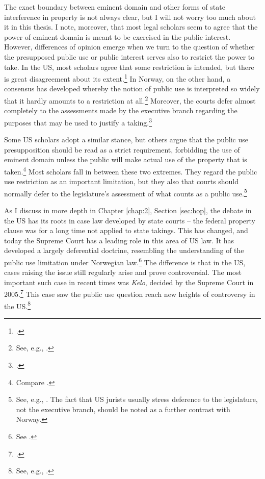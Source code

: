 The exact boundary between eminent domain and other forms of state interference in property is not always clear, but I will not worry too much about it in this thesis. I note, moreover, that most legal scholars seem to agree that the power of eminent domain is meant to be exercised in the public interest. However, differences of opinion emerge when we turn to the question of whether the presupposed public use or public interest serves also to restrict the power to take. In the US, most scholars agree that some restriction is intended, but there is great disagreement about its extent.\footcite[205]{berger78} In Norway, on the other hand, a consensus has developed whereby the notion of public use is interpreted so widely that it hardly amounts to a restriction at all.\footnote{See, e.g., \cite[368]{aall10}.} Moreover, the courts defer almost completely to the assessments made by the executive branch regarding the purposes that may be used to justify a taking.\footcite[368]{aall10}

Some US scholars adopt a similar stance, but others argue that the public use presupposition should be read as a strict requirement, forbidding the use of eminent domain unless the public will make actual use of the property that is taken.\footnote{Compare \cite{bell06,bell09,claeys04,sandefur06}.} Most scholars fall in between these two extremes. They regard the public use restriction as an important limitation, but they also  that courts should normally defer to the legislature's assessment of what counts as a public use.\footnote{See, e.g., \cite{merrill86,alexander05}. The fact that US jurists usually stress deference to the legislature, not the executive branch, should be noted as a further contrast with Norway.}

As I discuss in more depth in Chapter \ref{chap:2}, Section \ref{sec:hop}, the debate in the US has its roots in case law developed by state courts -- the federal property clause was for a long time not applied to state takings. This has changed, and today the Supreme Court has a leading role in this area of US law. It has developed a largely deferential doctrine, resembling the understanding of the public use limitation under Norwegian law.\footnote{See \cite{berman54,midkiff84,kelo05}.} The difference is that in the US, cases raising the issue still regularly arise and prove controversial. The most important such case in recent times was {\it Kelo}, decided by the Supreme Court in 2005.\footcite{kelo05} This case saw the public use question reach new heights of controversy in the US.\footnote{See, e.g., \cite{somin09}.}

